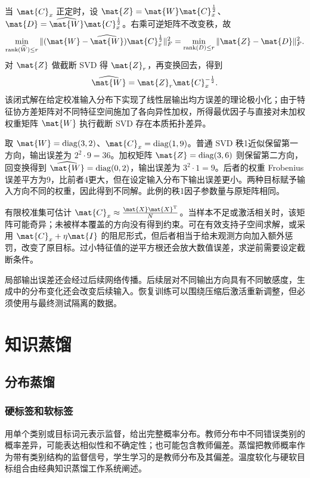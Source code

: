 \documentclass[../textbook.tex]{subfiles}
\begin{document}
当 $\mat{C}_x$ 正定时，设 $\mat{Z}=\mat{W}\mat{C}_x^{\frac{1}{2}}$、$\mat{D}=\widehat{\mat{W}}\mat{C}_x^{\frac{1}{2}}$。右乘可逆矩阵不改变秩，故
\begin{equation}
 \min_{\operatorname{rank}(\widehat W)\leq r}
 \|(\mat{W}-\widehat{\mat{W}})\mat{C}_x^{\frac{1}{2}}\|_F^2
 =\min_{\operatorname{rank}(D)\leq r}\|\mat{Z}-\mat{D}\|_F^2.
\end{equation}
对 $\mat{Z}$ 做截断 SVD 得 $\mat{Z}_r$，再变换回去，得到
\begin{equation}
 \widehat{\mat{W}}=\mat{Z}_r\mat{C}_x^{-\frac{1}{2}}.
 \label{eq:compress-whiten}
\end{equation}
该闭式解在给定校准输入分布下实现了线性层输出均方误差的理论极小化；由于特征协方差矩阵对不同特征空间施加了各向异性加权，所得最优因子与直接对未加权权重矩阵 $\mat{W}$ 执行截断 SVD 存在本质拓扑差异。

取 $\mat{W}=\operatorname{diag}(3,2)$、$\mat{C}_x=\operatorname{diag}(1,9)$。普通 SVD 秩1近似保留第一方向，输出误差为 $2^2\cdot9=36$。加权矩阵 $\mat{Z}=\operatorname{diag}(3,6)$ 则保留第二方向，回变换得到 $\widehat{\mat{W}}=\operatorname{diag}(0,2)$，输出误差为 $3^2\cdot1=9$。后者的权重 Frobenius 误差平方为9，比前者4更大，但在设定输入分布下输出误差更小。两种目标赋予输入方向不同的权重，因此得到不同解。此例的秩1因子参数量与原矩阵相同。

有限校准集可估计 $\mat{C}_x\approx \frac{\mat{X}\mat{X}^{\mathrm{T}}}{N}$。当样本不足或激活相关时，该矩阵可能奇异；未被样本覆盖的方向没有得到约束。可在有效支持子空间求解，或采用 $\mat{C}_x+\eta \mat{I}$ 的阻尼形式，但后者相当于给未观测方向加入额外惩罚，改变了原目标。过小特征值的逆平方根还会放大数值误差，求逆前需要设定截断条件。

局部输出误差还会经过后续网络传播。后续层对不同输出方向具有不同敏感度，生成中的分布变化还会改变后续输入。恢复训练可以围绕压缩后激活重新调整，但必须使用与最终测试隔离的数据。

\section{知识蒸馏}
\subsection{分布蒸馏}

\subsubsection{硬标签和软标签}
用单个类别或目标词元表示监督，给出完整概率分布。教师分布中不同错误类别的概率差异，可能表达相似性和不确定性；也可能包含教师偏差。蒸馏把教师概率作为带有类别结构的监督信号，学生学习的是教师分布及其偏差。温度软化与硬软目标组合由经典知识蒸馏工作系统阐述。\cite{hinton2015distilling}
\end{document}
